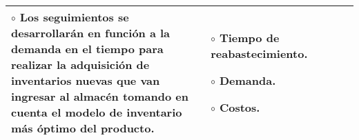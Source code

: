 \begin{matriz_consistencia}
\begin{landscape}
\begin{table}[h!]
\begin{tabular}{|p{4.2cm}|p{4.2cm}|p{4.2cm}|p{4.2cm}|p{4.2cm}|}
{    $\circ$ Los seguimientos se desarrollarán en función a la demanda en el tiempo para realizar la adquisición de inventarios nuevas que van ingresar al almacén tomando en cuenta el modelo de inventario más óptimo del producto.

    } & \multicolumn{1}{p{4.2cm}|}{
    \vspace{0.2cm}
    $\circ$ Tiempo de reabastecimiento.\vspace{0.2cm}

    $\circ$ Demanda.\vspace{0.2cm}

    $\circ$ Costos.
    }  & \\ \hline
\end{tabular}
\end{table}

\end{landscape}
\end{matriz_consistencia}